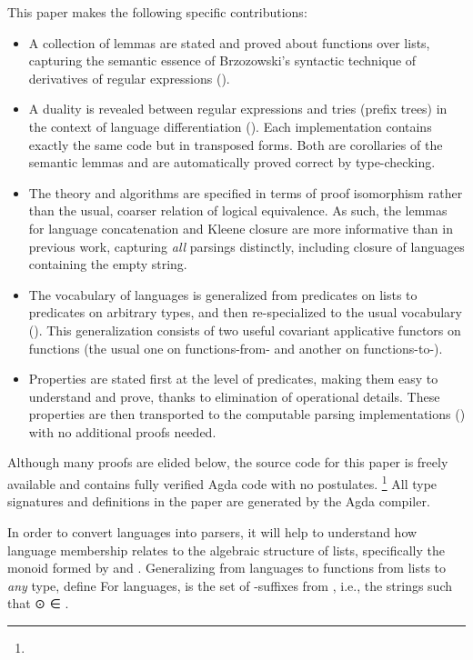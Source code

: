 \documentclass[acmsmall,screen,timestamp,anonymous,review]{acmart}
\begin{document}
This paper makes the following specific contributions:
\begin{itemize}
\item
  A collection of lemmas are stated and proved about functions over lists, capturing the semantic essence of Brzozowski's syntactic technique of derivatives of regular expressions ().
\item
  A duality is revealed between regular expressions and tries (prefix trees) in the context of language differentiation ().
  Each implementation contains exactly the same code but in transposed forms.
  Both are corollaries of the semantic lemmas and are automatically proved correct by type-checking.
\item
  The theory and algorithms are specified in terms of proof isomorphism rather than the usual, coarser relation of logical equivalence.
  As such, the lemmas for language concatenation and Kleene closure are more informative than in previous work, capturing \emph{all} parsings distinctly, including closure of languages containing the empty string.
\item
  The vocabulary of languages is generalized from predicates on lists to predicates on arbitrary types, and then re-specialized to the usual vocabulary ().
  This generalization consists of two useful covariant applicative functors on functions (the usual one on functions-from- and another on functions-to-).
\item
  Properties are stated first at the level of predicates, making them easy to understand and prove, thanks to elimination of operational details.
  These properties are then transported to the computable parsing implementations () with no additional proofs needed.
\end{itemize}
Although many proofs are elided below, the source code for this paper is freely available and contains fully verified Agda code with no postulates.%
\ifacm\else
\footnote{\protect\repoURL}
\fi{}
All type signatures and definitions in the paper are generated by the Agda compiler.


\rnc{}

In order to convert languages into parsers, it will help to understand how language membership relates to the algebraic structure of lists, specifically the monoid formed by  and \AIC{[]}.
Generalizing from languages to functions from lists to \emph{any} type, define
For languages, {  } is the set of -suffixes from , i.e., the strings  such that { \AF ⊙  \AF ∈ }.
\end{document}
